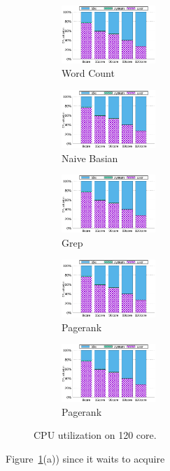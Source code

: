 \begin{figure}[tb]
    \centering
    \begin{subfigure}[b]{0.20\textwidth}
        \includegraphics[width=1.4in]{graph/wc_cpuutils.eps}
        \caption{Word Count}
    \end{subfigure}%
    \begin{subfigure}[b]{0.20\textwidth}
        \includegraphics[width=1.4in]{graph/wc_cpuutils.eps}
        \caption{Naive Basian}
    \end{subfigure}%
    \begin{subfigure}[b]{0.20\textwidth}
        \includegraphics[width=1.4in]{graph/wc_cpuutils.eps}
        \caption{Grep}
    \end{subfigure}%
        \begin{subfigure}[b]{0.20\textwidth}
        \includegraphics[width=1.4in]{graph/wc_cpuutils.eps}
        \caption{Pagerank}
    \end{subfigure}%
        \begin{subfigure}[b]{0.20\textwidth}
        \includegraphics[width=1.4in]{graph/wc_cpuutils.eps}
        \caption{Pagerank}
    \end{subfigure}
        \centering
    \caption{CPU utilization on 120 core.}
    \label{fig:utilization}
\end{figure}
Figure~\ref{fig:utilization}(a)) since it waits to acquire



